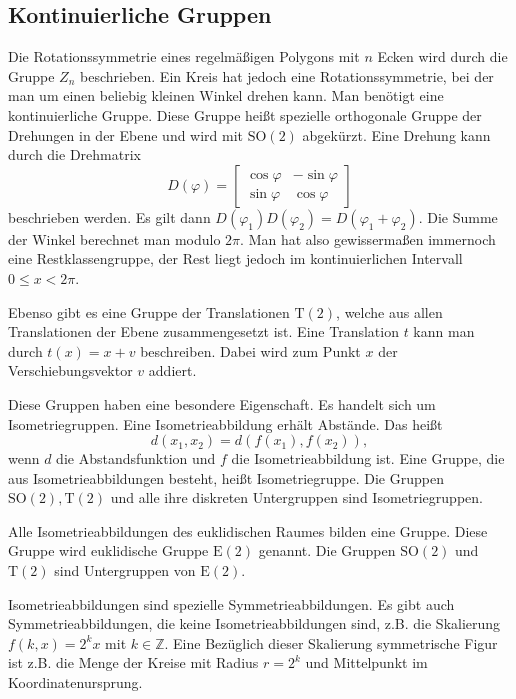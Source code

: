 \documentclass[a4paper,10pt,fleqn,twocolumn,twoside]{article}
\begin{document}
\subsection{Kontinuierliche Gruppen}

Die Rotationssymmetrie eines regelmäßigen Polygons mit $n$ Ecken wird durch die Gruppe $Z_n$ beschrieben. Ein Kreis hat jedoch eine Rotationssymmetrie, bei der man um einen beliebig kleinen Winkel drehen kann. Man benötigt eine kontinuierliche Gruppe. Diese Gruppe heißt spezielle orthogonale Gruppe der Drehungen in der Ebene und wird  mit $\mathrm{SO}(2)$ abgekürzt. Eine Drehung kann durch die Drehmatrix
\[D(\varphi) = \begin{bmatrix}
\cos\varphi & -\sin\varphi\\
\sin\varphi & \cos\varphi
\end{bmatrix}\]
beschrieben werden. Es gilt dann
$D(\varphi_1)D(\varphi_2)=D(\varphi_1+\varphi_2)$.
Die Summe der Winkel berechnet man modulo $2\pi$. Man hat
also gewissermaßen immernoch eine Restklassengruppe, der Rest liegt
jedoch im kontinuierlichen Intervall $0\le x<2\pi$.

Ebenso gibt es eine Gruppe der Translationen $\mathrm T(2)$, welche aus allen Translationen der Ebene zusammengesetzt ist. Eine Translation $t$ kann man durch $t(x)=x+v$ beschreiben. Dabei wird zum Punkt $x$ der Verschiebungsvektor $v$ addiert.

Diese Gruppen haben eine besondere Eigenschaft. Es handelt sich um Isometriegruppen. Eine Isometrieabbildung erhält Abstände. Das heißt
\[d(x_1,x_2)=d(f(x_1),f(x_2)),\]
wenn $d$ die Abstandsfunktion und $f$ die Isometrieabbildung ist. Eine Gruppe, die aus Isometrieabbildungen besteht, heißt Isometriegruppe.
Die Gruppen $\mathrm{SO}(2), \mathrm T(2)$ und alle ihre diskreten
Untergruppen sind Isometriegruppen.

Alle Isometrieabbildungen des euklidischen Raumes bilden eine Gruppe.
Diese Gruppe wird euklidische Gruppe $\mathrm E(2)$ genannt.
Die Gruppen $\mathrm{SO}(2)$ und $\mathrm T(2)$ sind Untergruppen
von $\mathrm E(2)$.

Isometrieabbildungen sind spezielle Symmetrieabbildungen.
Es gibt auch Symmetrieabbildungen, die keine Isometrieabbildungen sind,
z.B. die Skalierung $f(k,x) = 2^k x$ mit $k\in\mathbb Z$.
Eine Bezüglich dieser Skalierung symmetrische Figur ist z.B. die
Menge der Kreise mit Radius $r=2^k$ und Mittelpunkt im
Koordinatenursprung.
\end{document}
